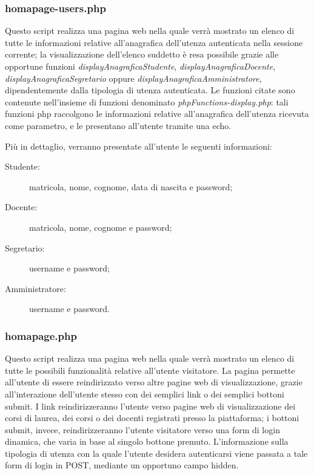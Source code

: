 \documentclass [a4paper,11pt]{book}
\begin{document}
\medskip

\subsubsection{homapage-users.php}

Questo script realizza una pagina web nella quale verrà mostrato un elenco di tutte le informazioni relative all'anagrafica dell'utenza autenticata nella sessione corrente; la visualizzazione dell'elenco suddetto è resa possibile grazie alle opportune funzioni \emph{displayAnagraficaStudente}, \emph{displayAnagraficaDocente}, \emph{displayAnagraficaSegretario} oppure \emph{displayAnagraficaAmministratore}, dipendentemente dalla tipologia di utenza autenticata. Le funzioni citate sono contenute nell'insieme di funzioni denominato \emph{phpFunctions-display.php}: tali funzioni php raccolgono le informazioni relative all'anagrafica dell'utenza ricevuta come parametro, e le presentano all'utente tramite una echo.

Più in dettaglio, verranno presentate all'utente le seguenti informazioni:
\begin{description}
\item[Studente:] matricola, nome, cognome, data di nascita e password;
\item[Docente:] matricola, nome, cognome e password;
\item[Segretario:] username e password;
\item[Amministratore:] username e password.
\end{description}

\medskip

\subsubsection{homapage.php}

Questo script realizza una pagina web nella quale verrà mostrato un elenco di tutte le possibili funzionalità relative all'utente visitatore. La pagina permette all'utente di essere reindirizzato verso altre pagine web di visualizzazione, grazie all'interazione dell'utente stesso con dei semplici link o dei semplici bottoni submit. I link reindirizzeranno l'utente verso pagine web di visualizzazione dei corsi di laurea, dei corsi o dei docenti registrati presso la piattaforma; i bottoni submit, invece, reindirizzeranno l'utente visitatore verso una form di login dinamica, che varia in base al singolo bottone premuto. L'informazione sulla tipologia di utenza con la quale l'utente desidera autenticarsi viene passata a tale form di login in POST, mediante un opportuno campo hidden.
\end{document}
